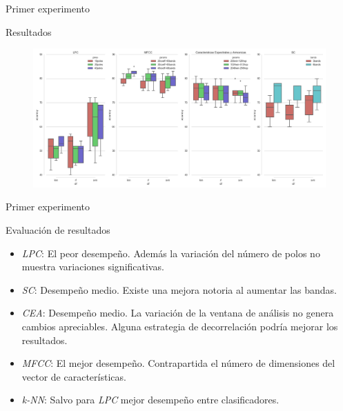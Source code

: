 \documentclass[aspectratio=169]{beamer}
\begin{document}
\begin{frame}{Primer experimento}
\begin{block}{Resultados}
\begin{figure}[H]
\begin{center}
\includegraphics[width=1\textwidth]{exp1_comparacion} 
\end{center}
\end{figure}
\end{block}

\end{frame}

\begin{frame}{Primer experimento}
\begin{block}{Evaluación de resultados}
\begin{itemize}
\item \textit{LPC}: El peor desempeño. Además la variación del número de polos no muestra variaciones significativas.
\item \textit{SC}: Desempeño medio. Existe una mejora notoria al aumentar las bandas.
\item \textit{CEA}: Desempeño medio. La variación de la ventana de análisis no genera cambios apreciables. Alguna estrategia de decorrelación podría mejorar los resultados.
\item \textit{MFCC}: El mejor desempeño. Contrapartida el número de dimensiones del vector de características.
\item \textit{k-NN}: Salvo para \textit{LPC} mejor desempeño entre clasificadores.
\end{itemize}
\end{block}
\end{frame}
\end{document}
